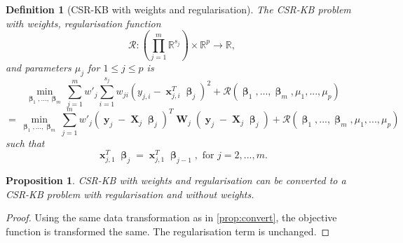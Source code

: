 \documentclass[12pt]{article}
\DeclareMathOperator{\bx}{\mathbf{x}}
\DeclareMathOperator{\bX}{\mathbf{X}}
\DeclareMathOperator{\by}{\mathbf{y}}
\DeclareMathOperator{\bW}{\mathbf{W}}
\DeclareMathOperator{\bbeta}{\boldsymbol{\beta}}
\newtheorem{defn}{Definition}
\newtheorem{prop}{Proposition}
\begin{document}
\begin{defn}[CSR-KB with weights and regularisation]
The CSR-KB problem with weights, regularisation function 
$$\mathcal{R} : \left(\prod_{j=1}^m \mathbb{R}^{s_j} \right) \times \mathbb{R}^p \to \mathbb{R},$$
and parameters $\mu_j$ for $1 \leq j \leq p$ is
$$\min_{\bbeta_1,...,\bbeta_m} \sum_{j=1}^m w'_j\sum_{i=1}^{s_j} w_{ji}(y_{j, i}-\bx_{j, i}^T\bbeta_j)^2+\mathcal{R}(\bbeta_1, ..., \bbeta_m, \mu_1, ..., \mu_p)$$
$$= \min_{\bbeta_1,...,\bbeta_m} \sum_{j=1}^m w'_j (\by_j-\bX_j\bbeta_j)^T\bW_j(\by_j-\bX_j\bbeta_j)+\mathcal{R}(\bbeta_1, ..., \bbeta_m, \mu_1, ..., \mu_p)$$
such that
$$\bx_{j, 1}^T \bbeta_j = \bx_{j, 1}^T \bbeta_{j-1}, \text{ for }j=2, ..., m.$$
\end{defn}
\begin{prop}
CSR-KB with weights and regularisation can be converted to a CSR-KB problem with regularisation and without weights.
\end{prop}
\begin{proof}
Using the same data transformation as in \ref{prop:convert}, the objective function is transformed the same. The regularisation term is unchanged.
\end{proof}
\end{document}
